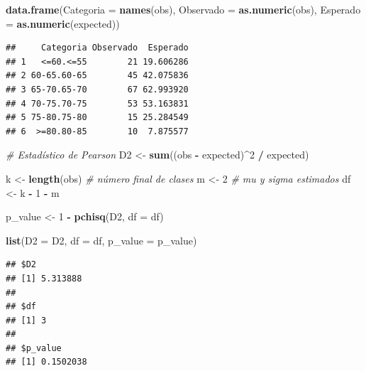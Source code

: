 \documentclass[
]{article}
\newenvironment{Shaded}{\begin{snugshade}}{\end{snugshade}}
\newcommand{\AttributeTok}[1]{\textcolor[rgb]{0.13,0.29,0.53}{#1}}
\newcommand{\CommentTok}[1]{\textcolor[rgb]{0.56,0.35,0.01}{\textit{#1}}}
\newcommand{\DecValTok}[1]{\textcolor[rgb]{0.00,0.00,0.81}{#1}}
\newcommand{\FunctionTok}[1]{\textcolor[rgb]{0.13,0.29,0.53}{\textbf{#1}}}
\newcommand{\NormalTok}[1]{#1}
\newcommand{\OtherTok}[1]{\textcolor[rgb]{0.56,0.35,0.01}{#1}}
\newcommand{\SpecialCharTok}[1]{\textcolor[rgb]{0.81,0.36,0.00}{\textbf{#1}}}
\begin{document}
\begin{Shaded}
\begin{Highlighting}[]
\FunctionTok{data.frame}\NormalTok{(}\AttributeTok{Categoria =} \FunctionTok{names}\NormalTok{(obs),}
           \AttributeTok{Observado =} \FunctionTok{as.numeric}\NormalTok{(obs),}
           \AttributeTok{Esperado  =} \FunctionTok{as.numeric}\NormalTok{(expected))}
\end{Highlighting}
\end{Shaded}

\begin{verbatim}
##     Categoria Observado  Esperado
## 1   <=60.<=55        21 19.606286
## 2 60-65.60-65        45 42.075836
## 3 65-70.65-70        67 62.993920
## 4 70-75.70-75        53 53.163831
## 5 75-80.75-80        15 25.284549
## 6  >=80.80-85        10  7.875577
\end{verbatim}

\begin{Shaded}
\begin{Highlighting}[]
\CommentTok{\# Estadístico de Pearson}
\NormalTok{D2 }\OtherTok{\textless{}{-}} \FunctionTok{sum}\NormalTok{((obs }\SpecialCharTok{{-}}\NormalTok{ expected)}\SpecialCharTok{\^{}}\DecValTok{2} \SpecialCharTok{/}\NormalTok{ expected)}

\NormalTok{k }\OtherTok{\textless{}{-}} \FunctionTok{length}\NormalTok{(obs)        }\CommentTok{\# número final de clases}
\NormalTok{m }\OtherTok{\textless{}{-}} \DecValTok{2}                  \CommentTok{\# mu y sigma estimados}
\NormalTok{df }\OtherTok{\textless{}{-}}\NormalTok{ k }\SpecialCharTok{{-}} \DecValTok{1} \SpecialCharTok{{-}}\NormalTok{ m}

\NormalTok{p\_value }\OtherTok{\textless{}{-}} \DecValTok{1} \SpecialCharTok{{-}} \FunctionTok{pchisq}\NormalTok{(D2, }\AttributeTok{df =}\NormalTok{ df)}

\FunctionTok{list}\NormalTok{(}\AttributeTok{D2 =}\NormalTok{ D2, }\AttributeTok{df =}\NormalTok{ df, }\AttributeTok{p\_value =}\NormalTok{ p\_value)}
\end{Highlighting}
\end{Shaded}

\begin{verbatim}
## $D2
## [1] 5.313888
## 
## $df
## [1] 3
## 
## $p_value
## [1] 0.1502038
\end{verbatim}
\end{document}
